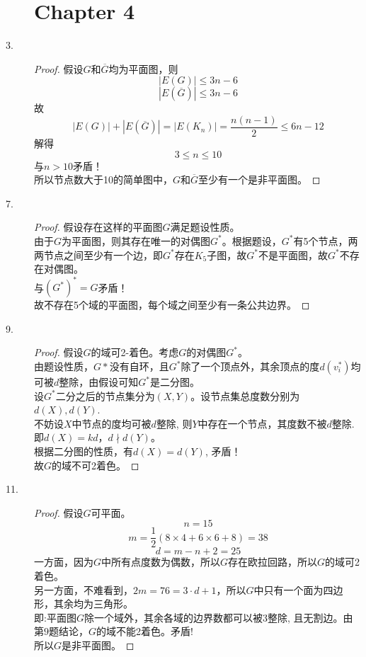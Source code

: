 \documentclass[UTF8, onecolumn, a4paper]{article}
\begin{document}
\begin{description}
\section*{Chapter 4}

\item[3.]
\begin{proof}
假设$G$和$\overline{G}$均为平面图，则
$$|E(G)| \leq 3n-6$$
$$|E(\overline{G})| \leq 3n-6 $$
故$$|E(G)| + |E(\overline{G})| = |E(K_n)| = \frac{n(n-1)}{2}\leq6n-12$$
解得$$3\leq n\leq 10$$
与$n > 10$矛盾！\\所以节点数大于10的简单图中，$G$和$\overline{G}$至少有一个是非平面图。
\end{proof}

\item[7.]
\begin{proof}
假设存在这样的平面图$G$满足题设性质。\\
由于$G$为平面图，则其存在唯一的对偶图$G^*$。根据题设，$G^*$有5个节点，两两节点之间至少有一个边，即$G^*$存在$K_5$子图，故$G^*$不是平面图，故$G^*$不存在对偶图。\\与$(G^*)^* = G$矛盾！\\
故不存在5个域的平面图，每个域之间至少有一条公共边界。
\end{proof}

\item[9.]
\begin{proof}
假设$G$的域可2-着色。考虑$G$的对偶图$G^*$。\\
由题设性质，$G*$没有自环，且$G^*$除了一个顶点外，其余顶点的度$d(v^*_i)$均可被$d$整除，由假设可知$G^*$是二分图。\\
设$G^*$二分之后的节点集分为$(X, Y)$。设节点集总度数分别为$d(X), d(Y)$.\\ 不妨设$X$中节点的度均可被$d$整除, 则$Y$中存在一个节点，其度数不被$d$整除. \\即$d(X) = kd$，$d \nmid d(Y)$。\\
根据二分图的性质，有$d(X) = d(Y)$, 矛盾！\\
故$G$的域不可2着色。
\end{proof}


\item[11.]
\begin{proof}
假设$G$可平面。
$$n = 15$$
$$m = \frac{1}{2}(8\times4 + 6\times6 + 8) = 38$$
$$d = m - n + 2 = 25$$
一方面，因为$G$中所有点度数为偶数，所以$G$存在欧拉回路，所以$G$的域可2着色。\\
另一方面，不难看到，$2m = 76 = 3\cdot d + 1$，所以$G$中只有一个面为四边形，其余均为三角形。\\即:平面图$G$除一个域外，其余各域的边界数都可以被$3$整除, 且无割边。由第$9$题结论，$G$的域不能2着色。矛盾!\\
所以$G$是非平面图。
\end{proof}


\end{description}
\end{document}
